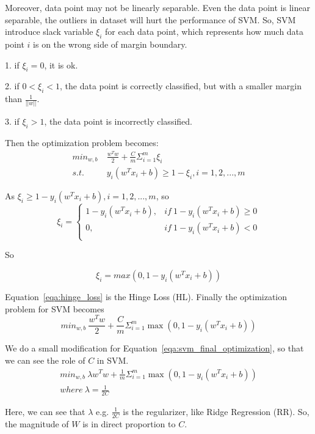 \documentclass[journal, a4paper]{IEEEtran}
\begin{document}
Moreover, data point may not be linearly separable. Even the data point is linear separable, the outliers in dataset will hurt the performance of SVM. So, SVM introduce slack variable $\xi_i $ for each data point, which represents how much data point $i$ is on the wrong side of margin boundary. \par
1. if $\xi_i = 0$, it is ok. \par
2. if $ 0 < \xi_i < 1 $, the data point is correctly classified, but with a smaller margin than $\frac{1}{||w||}$. \par
3. if $\xi_i > 1$, the data point is incorrectly classified. \par
Then the optimization problem becomes: 
\begin{equation}
	\begin{aligned}
	\label{eqa:svm_soft_optimization}
	min_{w, b}~&\frac{w^Tw}{2} + \frac{C}{m}\Sigma_{i=1}^m \xi_i \\
	s.t.~&y_i(w^Tx_i + b) \geq 1 - \xi_i, i=1, 2, ..., m
	\end{aligned}	
\end{equation} \par
As $ \xi_i \geq 1 - y_i(w^Tx_i + b), i=1, 2, ..., m$, so
\begin{equation}
\label{eqa:xi}
\xi_i = 
\left\{
\begin{array}{lr}
	1 - y_i(w^{T}x_i + b),&if~1 - y_i(w^{T}x_i + b) \geq 0  \\
	0,&if~1 - y_i(w^{T}x_i + b) < 0  \\
\end{array}
\right.
\end{equation} \par
So \par
\begin{equation}
	\label{eqa:hinge_loss}
	\xi_i = max(0, 1 - y_i(w^Tx_i + b))
\end{equation} \par
Equation~\ref{eqa:hinge_loss} is the Hinge Loss (HL). Finally the optimization problem for SVM becomes
\begin{equation}
\label{eqa:svm_final_optimization}
min_{w, b}~\frac{w^Tw}{2} + \frac{C}{m}\Sigma_{i=1}^m \max(0, 1 - y_i(w^Tx_i + b))
\end{equation} \par
We do a small modification for Equation~\ref{eqa:svm_final_optimization}, so that we can see the role of $C$ in SVM.
\begin{equation}
	\begin{aligned}
	min_{w, b}~\lambda w^Tw + \frac{1}{m}\Sigma_{i=1}^m \max(0, 1 - y_i(w^Tx_i + b)) \\
	where~\lambda = \frac{1}{2C}
	\end{aligned}
\end{equation} \par
Here, we can see that $\lambda$ e.g. $\frac{1}{2C}$ is the regularizer, like Ridge Regression (RR). So, the magnitude of $W$ is in direct proportion to $C$.
\end{document}
